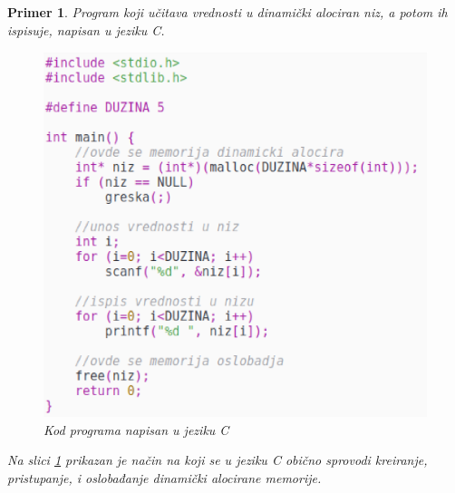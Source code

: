 \documentclass[a4paper]{article}
\newtheorem{primer}{Primer}[section]
\begin{document}
\begin{primer} Program koji učitava vrednosti u dinamički alociran niz, a potom ih ispisuje, napisan u jeziku C.

\begin{figure}[h!]
\begin{center}
\includegraphics[scale=0.4]{c_kod_dinamicka_alokacija.eps}
\end{center}
\caption{Kod programa napisan u jeziku C}
\label{fig:ckod}
\end{figure}

Na slici \ref{fig:ckod} prikazan je način na koji se u jeziku C obično sprovodi kreiranje, pristupanje, i oslobađanje dinamički alocirane memorije.
\end{primer}
\end{document}
